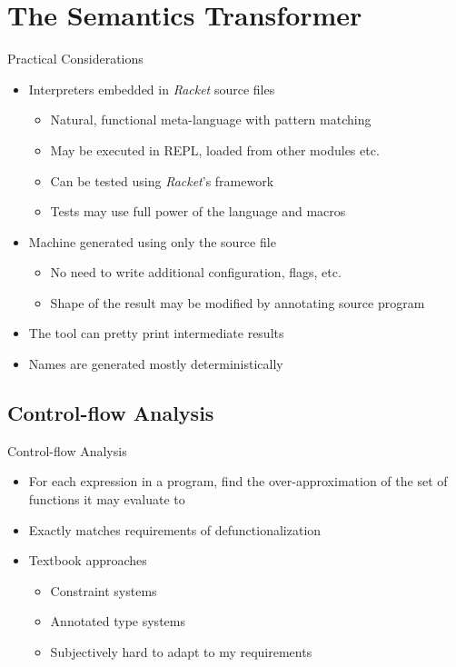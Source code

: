 \documentclass{beamer}
\begin{document}
\section{The Semantics Transformer}
\begin{frame}{Practical Considerations}
  \begin{itemize}
    \item Interpreters embedded in \textit{Racket} source files
    \begin{itemize}
      \item Natural, functional meta-language with pattern matching
      \item May be executed in REPL, loaded from other modules etc.
      \item Can be tested using \textit{Racket}'s framework
      \item Tests may use full power of the language and macros
    \end{itemize}
    \item Machine generated using only the source file
    \begin{itemize}
      \item No need to write additional configuration, flags, etc.
      \item Shape of the result may be modified by annotating source program
    \end{itemize}
    \item The tool can pretty print intermediate results
    \item Names are generated mostly deterministically
  \end{itemize}
\end{frame}

\subsection{Control-flow Analysis}

\begin{frame}{Control-flow Analysis}
  \begin{itemize}
    \item For each expression in a program, find the over-approximation of the set of functions it may evaluate to
    \item Exactly matches requirements of defunctionalization
    \item Textbook approaches
    \begin{itemize}
      \item Constraint systems
      \item Annotated type systems
      \item Subjectively hard to adapt to my requirements
    \end{itemize}
  \end{itemize}
\end{frame}
\end{document}
